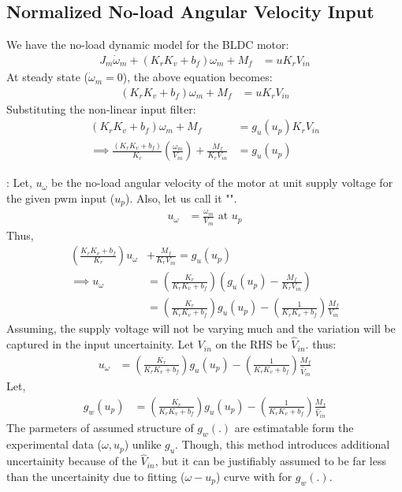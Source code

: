 \subsection{Normalized No-load Angular Velocity Input}

We have the no-load dynamic model for the BLDC motor:
\begin{align*}
    J_m \dot \omega_m + (K_r K_v  + b_f) \omega_m + M_f &= u K_r V_{in}
\end{align*}
At steady state ($\dot \omega_m = 0$), the above equation becomes:
\begin{align*}
    (K_r K_v  + b_f) \omega_m + M_f &= u K_r V_{in}
\end{align*}
Substituting the non-linear input filter:
\begin{align*}
    (K_r K_v  + b_f) \omega_m + M_f &= g_u(u_p) K_r V_{in}\\
    \implies \frac{(K_r K_v  + b_f)}{K_r} \left(\frac{\omega_m}{V_{in}}\right) + \frac{M_f}{K_r V_{in}} &= g_u(u_p)
\end{align*}

: Let, $u_{\omega}$ be the no-load angular velocity of the motor at unit supply voltage for the given pwm input ($u_p$). Also, let us call it "".
\begin{align*}
    u_{\omega} &= \frac{\omega_m}{V_{in}} \text{  at  } u_p
\end{align*}
Thus,
\begin{align*}
    \left(\frac{K_r K_v  + b_f}{K_r} \right) u_{\omega} &+ \frac{M_f}{K_r V_{in}} = g_u(u_p)\\
    \implies u_{\omega} &= \left(\frac{K_r}{K_r K_v  + b_f} \right) \left( g_u(u_p) - \frac{M_f}{K_r V_{in}} \right)\\
    &= \left(\frac{K_r}{K_r K_v  + b_f} \right) g_u(u_p) - \left(\frac{1}{K_r K_v  + b_f} \right) \frac{M_f}{V_{in}}
\end{align*}
Assuming, the supply voltage will not be varying much and the variation will be captured in the input uncertainity. Let $V_{in}$ on the RHS be $\hat V_{in}$. thus:
\begin{align*}
    u_{\omega} &= \left(\frac{K_r}{K_r K_v  + b_f} \right) g_u(u_p) - \left(\frac{1}{K_r K_v  + b_f} \right) \frac{M_f}{\hat V_{in}}
\end{align*}
Let,
\begin{align*}
    g_w (u_p) &= \left(\frac{K_r}{K_r K_v  + b_f} \right) g_u(u_p) - \left(\frac{1}{K_r K_v  + b_f} \right) \frac{M_f}{\hat V_{in}}
\end{align*}
The parmeters of assumed structure of $g_w(.)$ are estimatable form the experimental data ($\omega, u_p$) unlike $g_u$. Though, this method introduces additional uncertainity because of the $\hat V_{in}$, but it can be justifiably assumed to be far less than the uncertainity due to fitting ($\omega-u_p$) curve with for $g_w(.)$.

